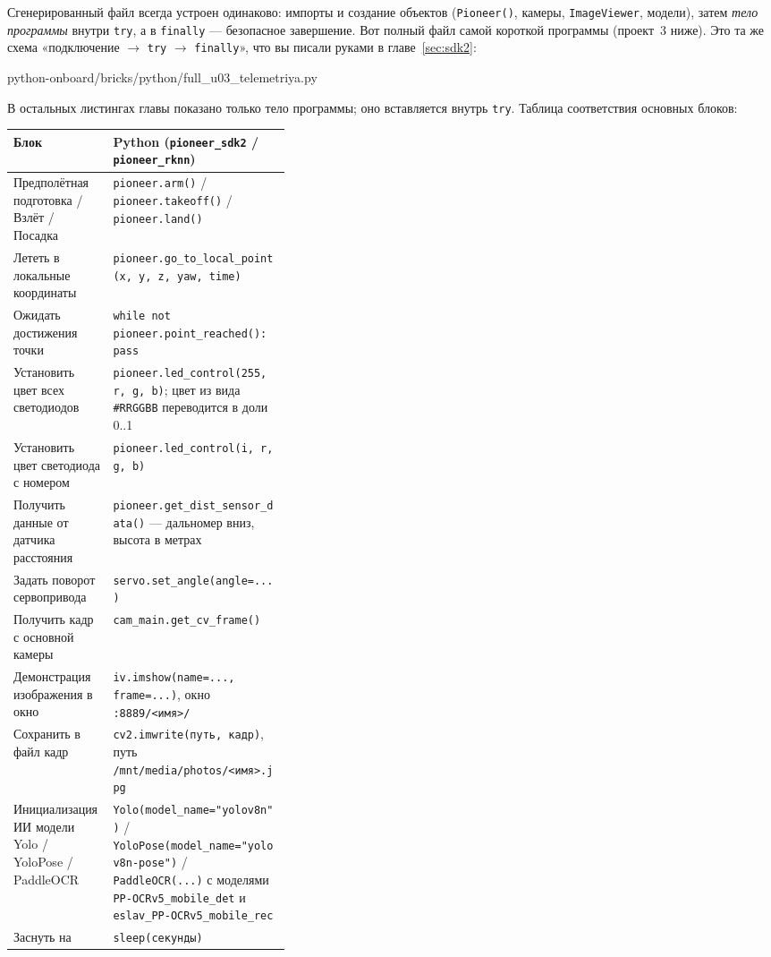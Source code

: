 Сгенерированный файл всегда устроен одинаково: импорты и создание объектов (\verb|Pioneer()|, камеры, \verb|ImageViewer|, модели), затем \emph{тело программы} внутри \verb|try|, а в \verb|finally| --- безопасное завершение. Вот полный файл самой короткой программы (проект~3 ниже). Это та же схема «подключение $\to$ \verb|try| $\to$ \verb|finally|», что вы писали руками в главе~\ref{sec:sdk2}:

\begin{codefile}[python]{python-onboard/bricks/python/full_u03_telemetriya.py}
\end{codefile}

В остальных листингах главы показано только тело программы; оно вставляется внутрь \verb|try|. Таблица соответствия основных блоков:

\begin{center}\small
\begin{tabularx}{\linewidth}{@{}>{\raggedright\arraybackslash}p{0.36\linewidth}X@{}}
\toprule
\textbf{Блок} & \textbf{Python (\texttt{pioneer\_sdk2} / \texttt{pioneer\_rknn})} \\
\midrule
Предполётная подготовка / Взлёт / Посадка & \verb|pioneer.arm()| / \verb|pioneer.takeoff()| / \verb|pioneer.land()| \\
Лететь в локальные координаты & \verb|pioneer.go_to_local_point(x, y, z, yaw, time)| \\
Ожидать достижения точки & \verb|while not pioneer.point_reached(): pass| \\
Установить цвет всех светодиодов & \verb|pioneer.led_control(255, r, g, b)|; цвет из вида \texttt{\#RRGGBB} переводится в доли 0..1 \\
Установить цвет светодиода с номером & \verb|pioneer.led_control(i, r, g, b)| \\
Получить данные от датчика расстояния & \verb|pioneer.get_dist_sensor_data()| --- дальномер вниз, высота в метрах \\
Задать поворот сервопривода & \verb|servo.set_angle(angle=...)| \\
Получить кадр с основной камеры & \verb|cam_main.get_cv_frame()| \\
Демонстрация изображения в окно & \verb|iv.imshow(name=..., frame=...)|, окно \texttt{:8889/<имя>/} \\
Сохранить в файл кадр & \verb|cv2.imwrite(путь, кадр)|, путь \texttt{/mnt/media/photos/<имя>.jpg} \\
Инициализация ИИ модели Yolo / YoloPose / PaddleOCR & \verb|Yolo(model_name="yolov8n")| / \verb|YoloPose(model_name="yolov8n-pose")| / \verb|PaddleOCR(...)| с моделями \texttt{PP-OCRv5\_mobile\_det} и \texttt{eslav\_PP-OCRv5\_mobile\_rec} \\
Заснуть на & \verb|sleep(секунды)| \\
\bottomrule
\end{tabularx}
\end{center}

